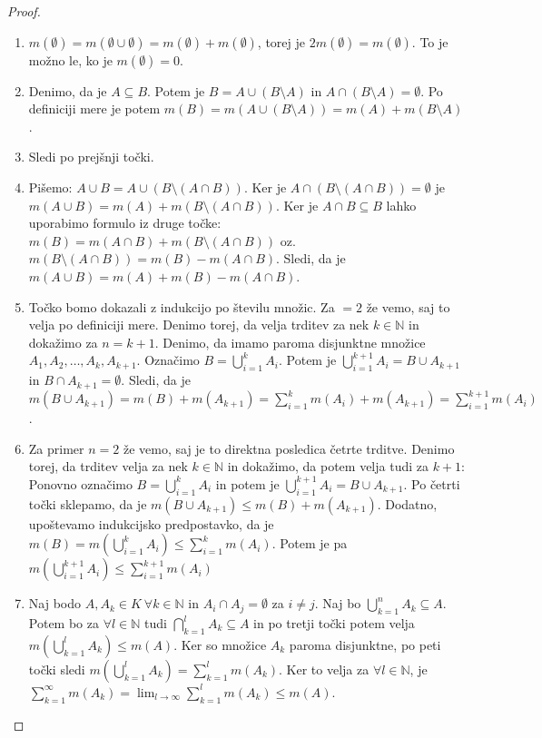 \documentclass[a4paper, 10pt]{article}
\newcommand{\mth}[1]{\ensuremath{\mathbb{#1}}}
\newcommand{\N}{\mth{N}}
\begin{document}
		\begin{proof}
			\begin{enumerate}
				\item $m(\emptyset) = m(\emptyset\cup\emptyset) = m(\emptyset) + m(\emptyset)$, torej je $2m(\emptyset) = m(\emptyset)$. To je možno le, ko je $m(\emptyset) = 0$.
				\item Denimo, da je $A\subseteq B$. Potem je $B = A\cup(B\setminus A)$ in $A \cap (B\setminus A) = \emptyset$. Po definiciji mere je potem $m(B) = m(A\cup(B\setminus A)) = m(A) + m(B\setminus A)$.
				\item Sledi po prejšnji točki.
				\item Pišemo: $A\cup B = A \cup (B\setminus (A\cap B))$. Ker je $A \cap (B\setminus (A\cap B)) = \emptyset$ je $m(A\cup B) = m(A) + m(B\setminus (A\cap B))$. Ker je $A\cap B \subseteq B$ lahko uporabimo formulo iz druge točke: $m(B) = m(A\cap B) + m(B\setminus (A\cap B))$ oz. $m(B\setminus (A\cap B)) = m(B) - m(A\cap B)$. Sledi, da je $m(A\cup B) = m(A) + m(B) - m(A\cap B)$.
				\item Točko bomo dokazali z indukcijo po številu množic. Za $ = 2$ že vemo, saj to velja po definiciji mere. Denimo torej, da velja trditev za nek $k\in\N$ in dokažimo za $n = k+1$. Denimo, da imamo paroma disjunktne množice $A_1, A_2, \ldots, A_k, A_{k+1}$. Označimo $B = \bigcup_{i = 1}^k A_i$. Potem je $\bigcup_{i = 1}^{k+1} A_i = B\cup A_{k+1}$ in $B\cap A_{k+1} = \emptyset$. Sledi, da je $m(B\cup A_{k+1}) = m(B) + m(A_{k+1}) = \sum_{i = 1}^k m(A_i) + m(A_{k+1}) = \sum_{i = 1}^{k+1}m(A_i)$.
				\item Za primer $n = 2$ že vemo, saj je to direktna posledica četrte trditve. Denimo torej, da trditev velja za nek $k\in \N$ in dokažimo, da potem velja tudi za $k+1$: Ponovno označimo $B = \bigcup_{i = 1}^{k}A_i$ in potem je $\bigcup_{i = 1}^{k+1}A_i = B\cup A_{k+1}$. Po četrti točki sklepamo, da je $m(B\cup A_{k+1}) \leq m(B) + m(A_{k+1})$. Dodatno, upoštevamo indukcijsko predpostavko, da je $m(B) = m(\bigcup_{i = 1}^{k}A_i)\leq \sum_{i = 1}^{k}m(A_i)$. Potem je pa $m(\bigcup_{i = 1}^{k+1}A_i) \leq \sum_{i = 1}^{k+1}m(A_i)$
				\item Naj bodo $A, A_k\in K~\forall k\in\N$ in $A_i\cap A_j = \emptyset$ za $i\neq j$. Naj bo $\bigcup_{k = 1}^n A_k \subseteq A$. Potem bo za $\forall l\in\N$ tudi $\bigcap_{k = 1}^l A_k \subseteq A$ in po tretji točki potem velja $m(\bigcup_{k = 1}^l A_k) \leq m(A)$. Ker so množice $A_k$ paroma disjunktne, po peti točki sledi $m(\bigcup_{k = 1}^l A_k) = \sum_{k = 1}^l m(A_k)$. Ker to velja za $\forall l\in \N$, je $\sum_{k = 1}^\infty m(A_k) = \lim_{l\to\infty}\sum_{k = 1}^l m(A_k) \leq m(A)$.
			\end{enumerate}
		\end{proof}
		
\end{document}
